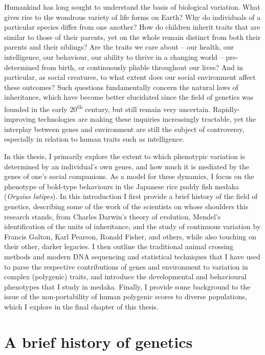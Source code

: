 \documentclass[
]{book}
\begin{document}
Humankind has long sought to understand the basis of biological variation. What gives rise to the wondrous variety of life forms on Earth? Why do individuals of a particular species differ from one another? How do children inherit traits that are similar to those of their parents, yet on the whole remain distinct from both their parents and their siblings? Are the traits we care about -- our health, our intelligence, our behaviour, our ability to thrive in a changing world -- pre-determined from birth, or continuously pliable throughout our lives? And in particular, as social creatures, to what extent does our social environment affect these outcomes? Such questions fundamentally concern the natural laws of inheritance, which have become better elucidated since the field of genetics was founded in the early 20\textsuperscript{th} century, but still remain very uncertain. Rapidly-improving technologies are making these inquiries increasingly tractable, yet the interplay between genes and environment are still the subject of controversy, especially in relation to human traits such as intelligence.

In this thesis, I primarily explore the extent to which phenotypic variation is determined by an individual's own genes, and how much it is mediated by the genes of one's social companions. As a model for these dynamics, I focus on the phenotype of bold-type behaviours in the Japanese rice paddy fish medaka (\emph{Oryzias latipes}). In this introduction I first provide a brief history of the field of genetics, describing some of the work of the scientists on whose shoulders this research stands, from Charles Darwin's theory of evolution, Mendel's identification of the units of inheritance, and the study of continuous variation by Francis Galton, Karl Pearson, Ronald Fisher, and others, while also touching on their other, darker legacies. I then outline the traditional animal crossing methods and modern DNA sequencing and statistical techniques that I have used to parse the respective contributions of genes and environment to variation in complex (polygenic) traits, and introduce the developmental and behavioural phenotypes that I study in medaka. Finally, I provide some background to the issue of the non-portability of human polygenic scores to diverse populations, which I explore in the final chapter of this thesis.

\hypertarget{a-brief-history-of-genetics}{%
\section{A brief history of genetics}\label{a-brief-history-of-genetics}}
\end{document}
